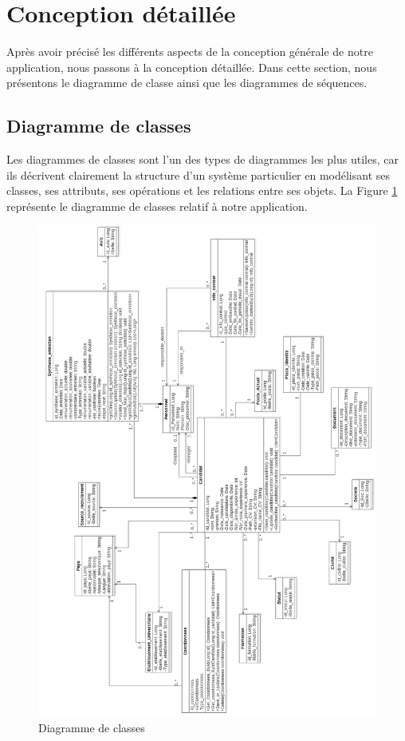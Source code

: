 \section{Conception détaillée}
Après avoir précisé les différents aspects de la conception générale de notre application, nous passons à la conception détaillée. Dans cette section, nous présentons le diagramme de classe ainsi que les diagrammes de séquences.
\subsection{Diagramme de classes}
Les diagrammes de classes sont l'un des types de diagrammes les plus utiles, car ils décrivent clairement la structure d’un système particulier en modélisant ses classes, ses attributs, ses opérations et les relations entre ses objets. La Figure \ref{fig:diagram_class} représente le diagramme de classes relatif à notre application.
 \begin{figure}[H]
     \centering
     \includegraphics[scale=0.45]{img/ClassDiagram2.png}
     \caption{Diagramme de classes}
     \label{fig:diagram_class}
 \end{figure}
